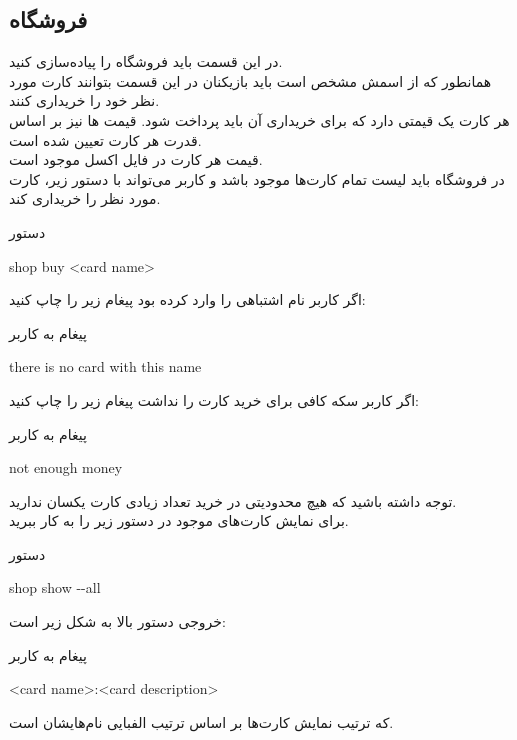 \documentclass[]{article}
\begin{document}
\subsection*{{\titr فروشگاه}}
در این قسمت باید فروشگاه را پیاده‌سازی کنید.
\\
همانطور که از اسمش مشخص است باید بازیکنان در این قسمت بتوانند کارت مورد نظر 
خود را خریداری کنند.
\\
هر کارت یک قیمتی دارد که برای خریداری آن باید پرداخت شود. قیمت ها نیز بر 
اساس قدرت هر کارت تعیین شده است.
\\
قیمت هر کارت در فایل اکسل موجود است.
\\
در فروشگاه باید لیست تمام کارت‌ها موجود باشد و کاربر می‌تواند با دستور زیر، 
کارت مورد نظر را خریداری کند.
\begin{mybox}[colback=yellow]{دستور}
	\begin{latin}	
		shop buy <card name>
	\end{latin}
\end{mybox}
اگر کاربر  نام اشتباهی را وارد کرده بود پیغام زیر را چاپ کنید:
\begin{mybox}[colback=yellow]{پیغام به کاربر}
	\begin{latin}	
		there is no card with this name
	\end{latin}
\end{mybox}
اگر کاربر سکه کافی برای خرید کارت را نداشت پیغام زیر را چاپ کنید:
\begin{mybox}[colback=yellow]{پیغام به کاربر}
	\begin{latin}	
		not enough money
	\end{latin}
\end{mybox}
توجه داشته باشید که هیچ محدودیتی در خرید تعداد زیادی کارت یکسان ندارید.
\\
برای نمایش کارت‌های موجود در  دستور زیر را به کار ببرید.
\begin{mybox}[colback=yellow]{دستور}
	\begin{latin}	
		shop show -{}-all
	\end{latin}
\end{mybox}
خروجی دستور بالا به شکل زیر است:
\begin{mybox}[colback=yellow]{پیغام به کاربر}
	\begin{latin}	
		<card name>:<card description>
	\end{latin}
\end{mybox}
که ترتیب نمایش کارت‌ها بر اساس ترتیب الفبایی نام‌هایشان است.
\end{document}
